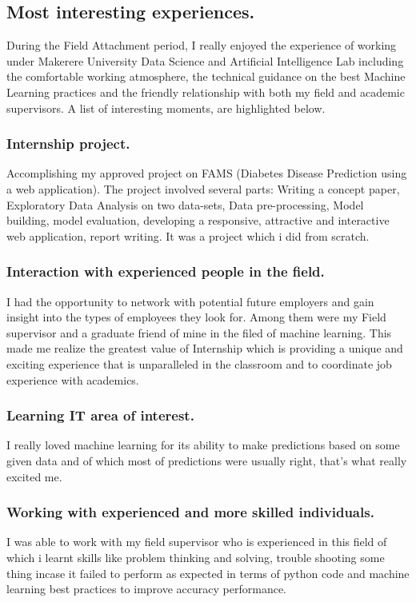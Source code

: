 \documentclass[11pt]{article}
\begin{document}
\subsection{Most interesting experiences.}
During the Field Attachment period, I really enjoyed the experience of working under Makerere University Data Science and Artificial Intelligence Lab  including
the comfortable working atmosphere, the technical guidance on the best Machine Learning practices and
the friendly relationship with both my field and academic supervisors. A list of interesting moments, are highlighted below.\\
\subsubsection{Internship project.}
Accomplishing my approved project on FAMS (Diabetes Disease Prediction using a web application). The
project involved several parts: Writing a concept paper, Exploratory Data Analysis on two data-sets, Data pre-processing, Model building, model evaluation, developing a responsive, attractive and interactive web application, report writing. It was a project which i did from scratch.\\
\subsubsection{Interaction with experienced people in the field.}
I had the opportunity to network with potential future employers and gain insight into the
types of employees they look for. Among them were my Field supervisor and a graduate friend of mine in the filed of machine learning. This made me realize the greatest value of Internship which is
providing a unique and exciting experience that is unparalleled in the classroom and to coordinate
job experience with academics.\\
\subsubsection{Learning IT area of interest.}
I really loved machine learning for its ability to make predictions based on some given data and of which most of predictions were usually right, that's what really excited me. 

\subsubsection{Working with experienced and more skilled individuals.}
I was able to work with my field supervisor who is experienced in this field of which i learnt skills like problem thinking and solving, trouble shooting some thing incase it failed to perform as expected in terms of python code and machine learning best practices to improve accuracy performance.
\end{document}
